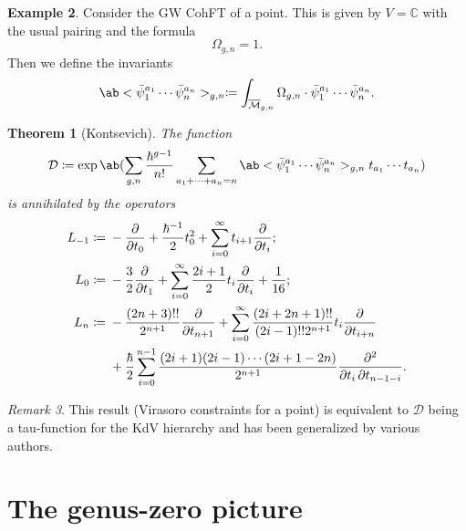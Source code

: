 \documentclass{amsart}
\newtheorem{thm}{Theorem}[section]
\theoremstyle{definition}
\newtheorem{exm}[thm]{Example}
\theoremstyle{remark}
\newtheorem{rmk}[thm]{Remark}
\theoremstyle{plain}
\theoremstyle{definition}
\theoremstyle{remark}
\newcommand{\C}{\mathbb{C}}
\newcommand{\Mbar}{\overline{\mathcal{M}}}
\newcommand{\mc}[1]{\mathcal{#1}}
\newcommand{\1}{\mathbf{1}}
\newcommand{\2}{\mathbf{2}}
\newcommand{\3}{\mathbf{3}}
\begin{document}
\begin{exm}
    Consider the GW CohFT of a point. This is given by $V = \C$ with the usual pairing and the formula 
    \[ \Omega_{g,n} = 1. \]
    Then we define the invariants
    \[ \ab<\bar{\psi}_1^{a_1} \cdots \bar{\psi}_n^{a_n}>_{g,n} \coloneqq \int_{\Mbar_{g,n}} \Omega_{g,n} \cdot \bar{\psi}_1^{a_1} \cdots \bar{\psi}_n^{a_n}. \]
    \begin{thm}[Kontsevich]
        The function
        \[ \mc{D} \coloneqq \exp \ab(\sum_{g,n} \frac{\hbar^{g-1}}{n!}\sum_{a_1 + \cdots + a_n = n} \ab<\bar{\psi}_1^{a_1} \cdots \bar{\psi}_n^{a_n}>_{g,n} t_{a_1}\cdots t_{a_n}) \]
        is annihilated by the operators
        \begin{align*}
            L_{-1} \coloneqq{}& -\pdv{}{t_0} + \frac{\hbar^{-1}}{2} t_0^2 + \sum_{i=0}^{\infty} t_{i+1} \pdv{}{t_i};\\
            L_0 \coloneqq{}& -\frac{3}{2} \pdv{}{t_1} + \sum_{i=0}^{\infty} \frac{2i+1}{2} t_i \pdv{}{t_i} + \frac{1}{16};\\
            L_n \coloneqq{}& -\frac{(2n+3)!!}{2^{n+1}} \pdv{}{t_{n+1}} + \sum_{i=0}^{\infty} \frac{(2i+2n+1)!!}{(2i-1)!! 2^{n+1}} t_i \pdv{}{t_{i+n}} \\
            &+ \frac{\hbar}{2} \sum_{i=0}^{n-1} \frac{(2i+1) (2i-1) \cdots (2i+1-2n)}{2^{n+1}} \pdv{}{t_i,t_{n-1-i}}.
        \end{align*}
    \end{thm}
\end{exm}

\begin{rmk}
    This result (Virasoro constraints for a point) is equivalent to $\mc{D}$ being a tau-function for the KdV hierarchy and has been generalized by various authors.
\end{rmk}

\section{The genus-zero picture}%
\label{sec:The genus-zero picture}
\end{document}
